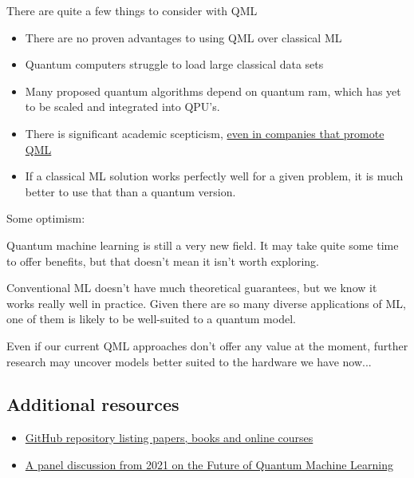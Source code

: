 There are quite a few things to consider with QML 
\begin{itemize}
    \item There are no proven advantages to using QML over classical ML 
    \item Quantum computers struggle to load large classical data sets 
    \item Many proposed quantum algorithms depend on quantum ram, which has yet to be scaled and integrated into QPU's. 
    \item There is significant academic scepticism, \href{https://www.youtube.com/watch?v=5UsJV2BNj2U&list=PLOFEBzvs-VvppIb0jg5_aDbmFs36DXD9w}{even in companies that promote QML}
    \item If a classical ML solution works perfectly well for a given problem, it is much better to use that than a quantum version. 
\end{itemize}


Some optimism: 

Quantum machine learning is still a very new field. It may take quite some time to offer benefits, but that doesn't mean it isn't worth exploring.

Conventional ML doesn't have much theoretical guarantees, but we know it works really well in practice. Given there are so many diverse applications of ML, one of them is likely to be well-suited to a quantum model.

Even if our current QML approaches don't offer any value at the moment, further research may uncover models better suited to the hardware we have now...

\subsection{Additional resources}
\begin{itemize}
    \item \href{https://github.com/Christophe-pere/Roadmap-to-QML}{GitHub repository listing papers, books and online courses}
    \item \href{https://www.youtube.com/watch?v=5UsJV2BNj2U&list=PLOFEBzvs-VvppIb0jg5_aDbmFs36DXD9w}{A panel discussion from 2021 on the Future of Quantum Machine Learning}
\end{itemize}
